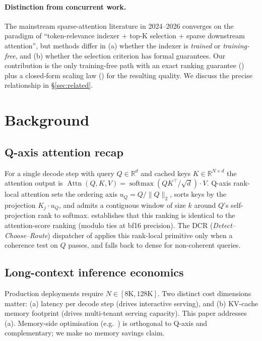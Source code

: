\documentclass[11pt]{article}
\theoremstyle{definition}
\theoremstyle{remark}
\theoremstyle{plain}
\DeclareMathOperator{\softmax}{softmax}
\DeclareMathOperator{\Attn}{Attn}
\newcommand{\R}{\mathbb{R}}
\begin{document}
\paragraph{Distinction from concurrent work.}
The mainstream sparse-attention literature in 2024–2026 \citep{tang2024quest,
liu2024retrievalattention,kang2024loki,deepseekv32,yuan2025nsa,hisa2026} converges
on the paradigm of
``token-relevance indexer + top-K selection + sparse downstream attention'',
but methods differ in (a) whether the indexer is \emph{trained} or
\emph{training-free}, and (b) whether the selection criterion has formal
guarantees. Our contribution is the only training-free path with an exact
ranking guarantee () plus a closed-form scaling law
() for the resulting quality. We discuss the precise relationship
in §\ref{sec:related}.

\section{Background}\label{sec:bg}

\subsection{Q-axis attention recap}
For a single decode step with query $Q\in\R^d$ and cached keys $K\in\R^{N\times d}$
the attention output is
$
\Attn(Q,K,V)=\softmax(QK^\top/\sqrt{d})\cdot V .
$
Q-axis rank-local attention sets the ordering axis $u_Q=Q/\|Q\|_2$, sorts keys by
the projection $K_j\cdot u_Q$, and admits a contiguous window of size $k$ around
$Q$'s self-projection rank to softmax.  establishes that this
ranking is identical to the attention-score ranking (modulo ties at bf16 precision).
The DCR (\emph{Detect–Choose–Route}) dispatcher of \citet{seqev2025qaxis} applies
this rank-local primitive only when a coherence test on $Q$ passes, and falls back
to dense for non-coherent queries.

\subsection{Long-context inference economics}
Production deployments require $N\in[8\text{K},128\text{K}]$. Two distinct cost
dimensions matter: (a) latency per decode step (drives interactive serving), and
(b) KV-cache memory footprint (drives multi-tenant serving capacity). This paper
addresses (a). Memory-side optimisation (e.g.\ \citealt{zhang2023h2o,li2024snapkv})
is orthogonal to Q-axis and complementary; we make no memory savings claim.
\end{document}
